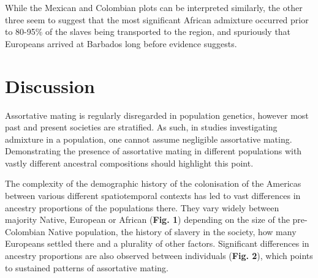\documentclass[11pt]{article}
\begin{document}
While the Mexican and Colombian plots can be interpreted similarly, the other three seem to suggest that the most significant African admixture occurred prior to 80-95\% of the slaves being transported to the region, and spuriously that Europeans arrived at Barbados long before evidence suggests. 







\vspace{8mm}
\section{Discussion}





Assortative mating is regularly disregarded in population genetics, however most past and present societies are stratified. As such, in studies investigating admixture in a population, one cannot assume negligible assortative mating. Demonstrating the presence of assortative mating in different populations with vastly different ancestral compositions should highlight this point. 

The complexity of the demographic history of the colonisation of the Americas between various different spatiotemporal contexts has led to vast differences in ancestry proportions of the populations there. They vary widely between majority Native, European or African (\textbf{Fig. 1}) depending on the size of the pre-Colombian Native population, the history of slavery in the society, how many Europeans settled there and a plurality of other factors. Significant differences in ancestry proportions are also observed between individuals (\textbf{Fig. 2}), which points to sustained patterns of assortative mating.
\end{document}
